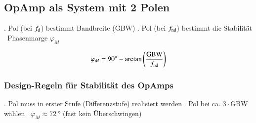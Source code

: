 \vspace{-0.2cm}



\subsection{OpAmp als System mit 2 Polen}

\begin{minipage}[c]{0.54\columnwidth}
    \begin{outline}
        . Pol (bei $f_{\rm d}$) bestimmt Bandbreite (GBW)
        . Pol (bei $f_{\rm nd}$) bestimmt die Stabilität \\
            \textrightarrow\ Phasenmarge $\varphi_M$
    \end{outline}
\end{minipage}
\hfill
\begin{minipage}[c]{0.42\columnwidth}
    \[
        \varphi_M = \qty{90}{\degree} - \arctan \left( \frac{\text{GBW}}{f_{\rm nd}} \right)
    \]
\end{minipage}


\subsubsection{Design-Regeln für Stabilität des OpAmps}

\begin{outline}
    . Pol muss in erster Stufe (Differenzstufe) realisiert werden
    . Pol bei ca. $3 \cdot \text{GBW}$ wählen \textrightarrow\ $\varphi_M \approx \qty{72}{\degree}$ (fast kein Überschwingen)
\end{outline}

